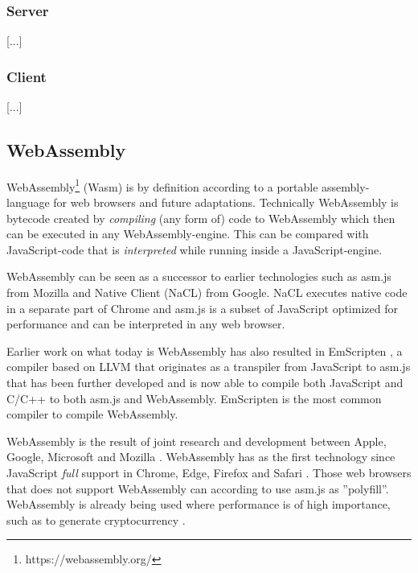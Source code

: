 \subsubsection*{Server}

[...]

\subsubsection*{Client}

[...]

\subsection{WebAssembly}

WebAssembly\footnote{https://webassembly.org/} (Wasm) is by definition according to \textcite{HaasRossbergSchuffTitzerHolmanGohmanWagnerZakaiBastien2017} a portable assembly-language for web browsers and future adaptations. Technically WebAssembly is bytecode created by \emph{compiling} (any form of) code to WebAssembly \parencite{Watt2018} which then can be executed in any WebAssembly-engine. This can be compared with JavaScript-code that is \emph{interpreted} while running inside a JavaScript-engine.

WebAssembly can be seen as a successor to earlier technologies such as asm.js from Mozilla and Native Client (NaCL) from Google. NaCL executes native code in a separate part of Chrome and asm.js  \parencite{Zakai2018} is a subset of JavaScript optimized for performance \parencite{VanEsNicolayStievenartDHondtDeRoover2016} and can be interpreted in any web browser.

Earlier work on what today is WebAssembly has also resulted in EmScripten \parencite{Zakai2011}, a compiler based on LLVM \parencite{LattnerAdve2014} that originates as a transpiler from JavaScript to asm.js \parencite{Zakai2011} that has been further developed \parencite{HaasRossbergSchuffTitzerHolmanGohmanWagnerZakaiBastien2017} and is now able to compile both JavaScript and C/C++ to both asm.js and WebAssembly. EmScripten is the most common compiler to compile WebAssembly.

WebAssembly is the result of joint research and development between Apple, Google, Microsoft and Mozilla \parencite{HaasRossbergSchuffTitzerHolmanGohmanWagnerZakaiBastien2017}. WebAssembly has as the first technology since JavaScript \emph{full} support in Chrome, Edge, Firefox and Safari \parencite{Moller2018}. Those web browsers that does not support WebAssembly can according to \textcite{HaasRossbergSchuffTitzerHolmanGohmanWagnerZakaiBastien2017} use asm.js as ''polyfill''. WebAssembly is already being used where performance is of high importance, such as to generate cryptocurrency \parencite{RuthZimmermannWolsingHohlfeld2018}.

